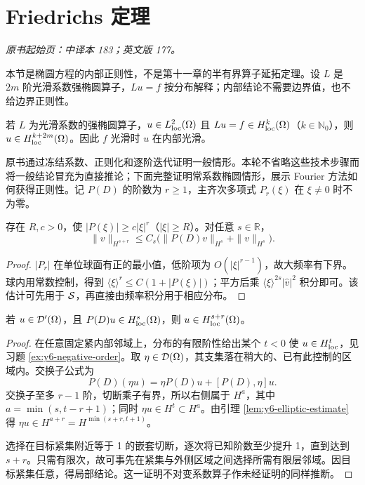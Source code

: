 \section{Friedrichs 定理}\label{sec:yosida-06-09}
\noindent\textit{原书起始页：中译本 183；英文版 177。}

本节是椭圆方程的内部正则性，不是第十一章的半有界算子延拓定理。设 $L$ 是 $2m$ 阶光滑系数强椭圆算子，$Lu=f$ 按分布解释；内部结论不需要边界值，也不给边界正则性。

\begin{theorem}\label{thm:y6-friedrichs}
若 $L$ 为光滑系数的强椭圆算子，$u\in L^2_{\mathrm{loc}}(\Omega)$ 且 $Lu=f\in H^k_{\mathrm{loc}}(\Omega)$（$k\in\mathbb N_0$），则 $u\in H^{k+2m}_{\mathrm{loc}}(\Omega)$。因此 $f$ 光滑时 $u$ 在内部光滑。
\end{theorem}

原书通过冻结系数、正则化和逐阶迭代证明一般情形。本轮不省略这些技术步骤而将一般结论冒充为直接推论；下面完整证明常系数椭圆情形，展示 Fourier 方法如何获得正则性。记 $P(D)$ 的阶数为 $r\ge1$，主齐次多项式 $P_r(\xi)$ 在 $\xi\ne0$ 时不为零。

\begin{lemma}[常系数椭圆估计]\label{lem:y6-elliptic-estimate}
存在 $R,c>0$，使 $|P(\xi)|\ge c|\xi|^r$（$|\xi|\ge R$）。对任意 $s\in\mathbb R$，
\[
 \|v\|_{H^{s+r}}\le C_s\bigl(\|P(D)v\|_{H^s}+\|v\|_{H^s}\bigr).
\]
\end{lemma}
\begin{proof}
$|P_r|$ 在单位球面有正的最小值，低阶项为 $O(|\xi|^{r-1})$，故大频率有下界。球内用常数控制，得到 $\langle\xi\rangle^r\le C(1+|P(\xi)|)$；平方后乘 $\langle\xi\rangle^{2s}|\widehat v|^2$ 积分即可。该估计可先用于 $\mathcal{S}$，再直接由频率积分用于相应分布。
\end{proof}

\begin{theorem}[常系数椭圆算子的内部正则性]\label{thm:y6-constant-regularity}
若 $u\in\mathcal{D}'(\Omega)$，且 $P(D)u\in H^s_{\mathrm{loc}}(\Omega)$，则 $u\in H^{s+r}_{\mathrm{loc}}(\Omega)$。
\end{theorem}
\begin{proof}
在任意固定紧内部邻域上，分布的有限阶性给出某个 $t<0$ 使 $u\in H^t_{\mathrm{loc}}$，见习题 \ref{ex:y6-negative-order}。取 $\eta\in\mathcal{D}(\Omega)$，其支集落在稍大的、已有此控制的区域内。交换子公式为
\[
 P(D)(\eta u)=\eta P(D)u+[P(D),\eta]u.
\]
交换子至多 $r-1$ 阶，切断乘子有界，所以右侧属于 $H^a$，其中 $a=\min(s,t-r+1)$；同时 $\eta u\in H^t\subset H^a$。由引理 \ref{lem:y6-elliptic-estimate} 得 $\eta u\in H^{a+r}=H^{\min(s+r,t+1)}$。

选择在目标紧集附近等于 1 的嵌套切断，逐次将已知阶数至少提升 1，直到达到 $s+r$。只需有限次，故可事先在紧集与外侧区域之间选择所需有限层邻域。因目标紧集任意，得局部结论。这一证明不对变系数算子作未经证明的同样推断。
\end{proof}

